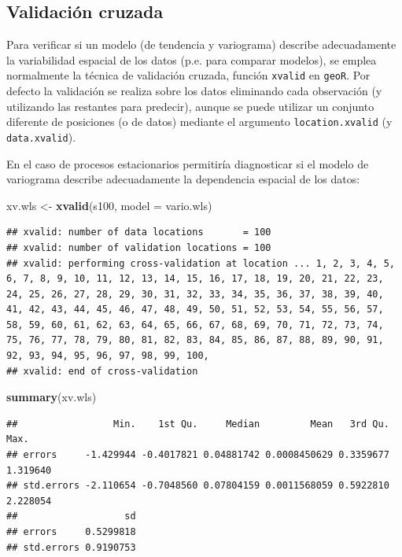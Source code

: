 \documentclass[
]{book}
\newenvironment{Shaded}{\begin{snugshade}}{\end{snugshade}}
\newcommand{\AttributeTok}[1]{\textcolor[rgb]{0.13,0.29,0.53}{#1}}
\newcommand{\FunctionTok}[1]{\textcolor[rgb]{0.13,0.29,0.53}{\textbf{#1}}}
\newcommand{\NormalTok}[1]{#1}
\newcommand{\OtherTok}[1]{\textcolor[rgb]{0.56,0.35,0.01}{#1}}
\theoremstyle{break}
\theoremstyle{definition}
\theoremstyle{definition}
\theoremstyle{definition}
\theoremstyle{definition}
\theoremstyle{remark}
\begin{document}
\subsection{Validación cruzada}\label{validaciuxf3n-cruzada}

Para verificar si un modelo (de tendencia y variograma) describe adecuadamente
la variabilidad espacial de los datos (p.e. para comparar modelos), se emplea
normalmente la técnica de validación cruzada, función \texttt{xvalid} en \texttt{geoR}.
Por defecto la validación se realiza sobre los datos eliminando cada
observación (y utilizando las restantes para predecir), aunque se puede
utilizar un conjunto diferente de posiciones (o de datos) mediante el
argumento \texttt{location.xvalid} (y \texttt{data.xvalid}).

En el caso de procesos estacionarios permitiría diagnosticar si el modelo de
variograma describe adecuadamente la dependencia espacial de los datos:

\begin{Shaded}
\begin{Highlighting}[]
\NormalTok{xv.wls }\OtherTok{\textless{}{-}} \FunctionTok{xvalid}\NormalTok{(s100, }\AttributeTok{model =}\NormalTok{ vario.wls)}
\end{Highlighting}
\end{Shaded}

\begin{verbatim}
## xvalid: number of data locations       = 100
## xvalid: number of validation locations = 100
## xvalid: performing cross-validation at location ... 1, 2, 3, 4, 5, 6, 7, 8, 9, 10, 11, 12, 13, 14, 15, 16, 17, 18, 19, 20, 21, 22, 23, 24, 25, 26, 27, 28, 29, 30, 31, 32, 33, 34, 35, 36, 37, 38, 39, 40, 41, 42, 43, 44, 45, 46, 47, 48, 49, 50, 51, 52, 53, 54, 55, 56, 57, 58, 59, 60, 61, 62, 63, 64, 65, 66, 67, 68, 69, 70, 71, 72, 73, 74, 75, 76, 77, 78, 79, 80, 81, 82, 83, 84, 85, 86, 87, 88, 89, 90, 91, 92, 93, 94, 95, 96, 97, 98, 99, 100, 
## xvalid: end of cross-validation
\end{verbatim}

\begin{Shaded}
\begin{Highlighting}[]
\FunctionTok{summary}\NormalTok{(xv.wls)}
\end{Highlighting}
\end{Shaded}

\begin{verbatim}
##                 Min.    1st Qu.     Median         Mean   3rd Qu.     Max.
## errors     -1.429944 -0.4017821 0.04881742 0.0008450629 0.3359677 1.319640
## std.errors -2.110654 -0.7048560 0.07804159 0.0011568059 0.5922810 2.228054
##                   sd
## errors     0.5299818
## std.errors 0.9190753
\end{verbatim}
\end{document}
